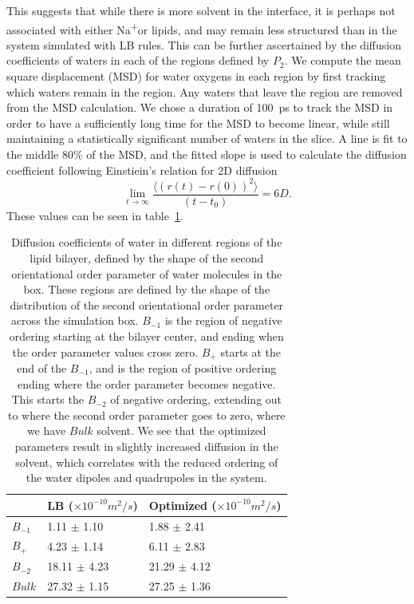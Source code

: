 \documentclass[12pt,openany,final]{book}
\newcommand{\na}{Na\textsuperscript{+}}
\begin{document}
This suggests that while there is more solvent in the interface, it is perhaps not
associated with either \na or lipids, and may remain less structured than
in the system simulated with LB rules.  
This can be further ascertained by the diffusion coefficients of waters 
in each of the regions defined by $P_2$. 
We compute the mean square displacement (MSD) for water oxygens
in each region by first tracking which waters remain in the region. 
Any waters that leave the region are removed from the MSD calculation. 
We chose a duration of 100~ps to track the MSD in order
to have a sufficiently long time for the MSD to become linear, 
while still maintaining a statistically significant number of waters in the slice. 
A line is fit to the middle 80\% of the MSD, and the fitted
slope is used to calculate the diffusion coefficient following
Einstiein's relation for 2D diffusion
\begin{equation}
\lim_{t \to \infty}\frac{\big\langle (r(t) - r(0))^2 \big\rangle}{(t-t_0)} = 6D. 
\end{equation}
These values can be seen in table~\ref{tab:diff}. 
\begin{table}[h!]
    \caption[Diffusion coefficients of water]{
Diffusion coefficients of water in different regions of the lipid bilayer, 
defined by the shape of the second orientational order parameter of water molecules in the box. 
These regions are defined by the shape of the distribution of the second 
    orientational order parameter across the simulation box. $B_{-1}$ is the region 
    of negative ordering starting at the bilayer center, and ending 
    when the order parameter values cross zero. 
    $B_{+}$ starts at the end of the $B_{-1}$, and is the region of positive ordering ending where the order parameter 
    becomes negative. This starts the $B_{-2}$ of negative ordering, extending out to where the 
second order parameter goes to zero, where we have $Bulk$ solvent.
We see that the optimized parameters result in slightly 
    increased diffusion in the solvent, which correlates with the reduced
    ordering of the water dipoles and quadrupoles in the
system.}
    \label{tab:diff}
    {\footnotesize
    \begin{tabularx}{\textwidth}{X|X|X|}
              &LB ($\times 10^{-10} m^2/s$)&Optimized ($\times 10^{-10} m^2/s$)\\\hline
        $B_{-1}$ &1.11 $\pm$ 1.10& 1.88 $\pm$ 2.41   \\
        $B_+$    &4.23 $\pm$ 1.14& 6.11 $\pm$ 2.83  \\
        $B_{-2}$ &18.11 $\pm$ 4.23&21.29 $\pm$ 4.12 \\
        $Bulk$   &27.32 $\pm$ 1.15 &27.25 $\pm$ 1.36 \\
              \end{tabularx}
          }
\end{table}
\end{document}
